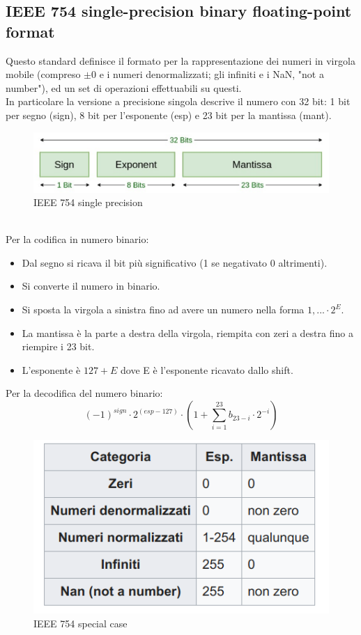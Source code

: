\documentclass[]{IEEEtran}
\begin{document}
\subsection{IEEE 754 single-precision binary floating-point format}
Questo standard definisce il formato per la rappresentazione dei numeri in virgola mobile (compreso $\pm 0$ e i numeri denormalizzati; gli infiniti e i NaN, "not a number"), ed un set di operazioni effettuabili su questi. 
\\In particolare la versione a precisione singola descrive il numero con 32 bit: 1 bit per segno (sign), 8 bit per l'esponente (esp) e 23 bit per la mantissa (mant)\cite{IEEE754}.
\begin{figure}[!htb]
    \centering
    \includegraphics[width=0.9\linewidth]{figures/ieee754_single_precision.png}
    \caption{IEEE 754 single precision}
    \label{fig:IEEE754}
\end{figure}
\\Per la codifica in numero binario:
\begin{itemize}
    \item Dal segno si ricava il bit più significativo (1 se negativato 0 altrimenti).
    \item Si converte il numero in binario.
    \item Si sposta la virgola a sinistra fino ad avere un numero nella forma $1,... \cdot 2^{E}$.
    \item La mantissa è la parte a destra della virgola, riempita con zeri a destra fino a riempire i 23 bit.
    \item L'esponente è $127+E$ dove E è l'esponente ricavato dallo shift.
\end{itemize}
Per la decodifica del numero binario: $$(-1)^{sign}\cdot 2^{(esp-127)} \cdot (1 + \sum_{i=1}^{23}b_{23-i}\cdot 2^{-i})$$
\begin{figure}[!htb]
    \centering
    \includegraphics[width=0.6\linewidth]{figures/ieee754_special_case.png}
    \caption{IEEE 754 special case}
    \label{fig:IEEE_SPECIALCASE}
\end{figure}
\end{document}

